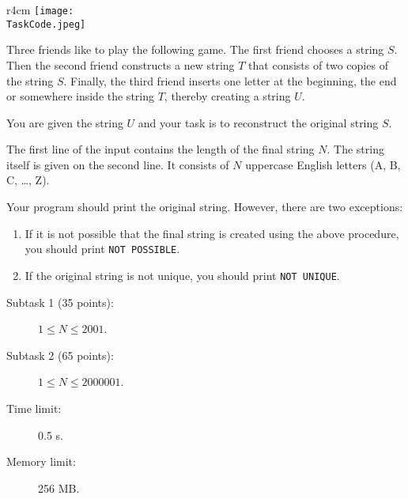 \documentclass{boi2014}
\renewcommand{\TaskCode}{friends}
\begin{document}
    \begin{wrapfigure}{r}{4cm}
        \vspace{-24pt}
		\texttt{[image: \\TaskCode.jpeg]}
	\end{wrapfigure}
    Three friends like to play the following game.
    The first friend chooses a string $S$.
    Then the second friend constructs a new string $T$ that consists of
    two copies of the string $S$. 
    Finally, the third friend inserts one letter at the beginning, the end or somewhere
    inside the string $T$, thereby creating a string $U$.

    \Task
    You are given the string $U$ and your task is to reconstruct the original string $S$.

    \Input
    The first line of the input contains the length of the final string $N$.
    The string itself is given on the second line. It consists of $N$
    uppercase English letters (A, B, C, \ldots{}, Z).

    \Output
    Your program should print the original string.
    However, there are two exceptions:
    \begin{enumerate}
        \item If it is not possible that the final string is created using the above
        procedure, you should print {\tt NOT POSSIBLE}.
        \item If the original string is not unique, you should print {\tt NOT
        UNIQUE}.
    \end{enumerate}

    \Examples


    \Scoring

    \begin{description}
        \item[Subtask 1 (35 points):] $1 \le N \le 2001$.
        \item[Subtask 2 (65 points):] $1 \le N \le 2000001$.
    \end{description}

    \Constraints

    \begin{description}
        \item[Time limit:] 0.5 s.
        \item[Memory limit:] 256 MB.
    \end{description}
\end{document}
